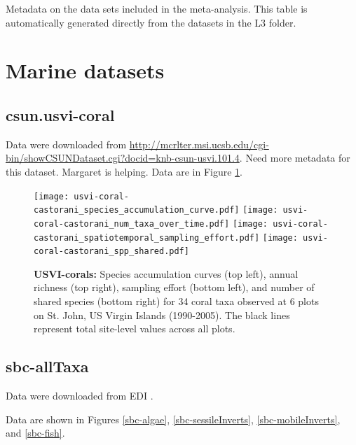 \documentclass[11pt, oneside]{article}
\begin{document}
\begin{table}[h!]
\scriptsize
   \centering
     \caption{Metadata on the data sets included in the meta-analysis. This table is automatically generated directly from the datasets in the L3 folder.} 

   \label{metadata} 
\end{table}


\section {Marine datasets}


\subsection {csun.usvi-coral}
Data were downloaded from \url{http://mcrlter.msi.ucsb.edu/cgi-bin/showCSUNDataset.cgi?docid=knb-csun-usvi.101.4}.
Need more metadata for this dataset.
Margaret is helping.
Data are in Figure \ref{usvi-coral}.

\begin{figure}[h!]
\centering
\texttt{[image: usvi-coral-castorani\_species\_accumulation\_curve.pdf]}
\texttt{[image: usvi-coral-castorani\_num\_taxa\_over\_time.pdf]}
\texttt{[image: usvi-coral-castorani\_spatiotemporal\_sampling\_effort.pdf]}
\texttt{[image: usvi-coral-castorani\_spp\_shared.pdf]}
\caption{{\bf USVI-corals:} Species accumulation curves (top left),  annual richness (top right), sampling effort (bottom left), and number of shared species (bottom right)  for 34 coral taxa observed at 6 plots on St. John, US Virgin Islands (1990-2005). The black lines represent total site-level values across all plots.}
\label{usvi-coral}
\end{figure}

\subsection {sbc-allTaxa}
Data were downloaded from EDI \citep{sbc}. 

Data are shown in Figures \ref{sbc-algae},  \ref{sbc-sessileInverts}, \ref{sbc-mobileInverts}, and \ref{sbc-fish}.
\end{document}
